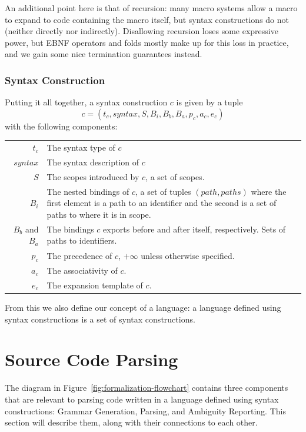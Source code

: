 \documentclass{kththesis}
\begin{document}
An additional point here is that of recursion: many macro systems allow a macro to expand to code containing the macro itself, but syntax constructions do not (neither directly nor indirectly). Disallowing recursion loses some expressive power, but EBNF operators and folds mostly make up for this loss in practice, and we gain some nice termination guarantees instead.

\subsubsection{Syntax Construction}

Putting it all together, a syntax construction $c$ is given by a tuple
$$ c = (t_c, syntax, S, B_i, B_b, B_a, p_c, a_c, e_c) $$
with the following components:

\begin{tabular}{r|p{10cm}}
$t_c$ & The syntax type of $c$ \\
$syntax$ & The syntax description of $c$ \\
$S$ & The scopes introduced by $c$, a set of scopes. \\
$B_i$ & The nested bindings of $c$, a set of tuples $(path, paths)$ where the first element is a path to an identifier and the second is a set of paths to where it is in scope. \\
$B_b$ and $B_a$ & The bindings $c$ exports before and after itself, respectively. Sets of paths to identifiers. \\
$p_c$ & The precedence of $c$, $+\infty$ unless otherwise specified. \\
$a_c$ & The associativity of $c$. \\
$e_c$ & The expansion template of $c$. \\
\end{tabular}

From this we also define our concept of a language: a language defined using syntax constructions is a set of syntax constructions.

\section{Source Code Parsing}

The diagram in Figure~\ref{fig:formalization-flowchart} contains three components that are relevant to parsing code written in a language defined using syntax constructions: Grammar Generation, Parsing, and Ambiguity Reporting. This section will describe them, along with their connections to each other.
\end{document}
